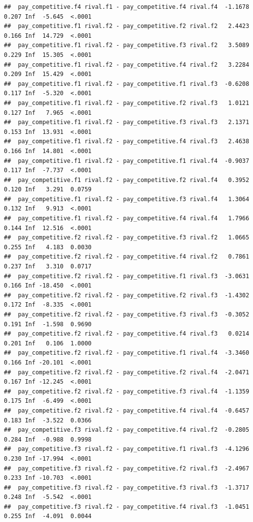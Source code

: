 \documentclass[
]{article}
\begin{document}
\begin{verbatim}
##  pay_competitive.f4 rival.f1 - pay_competitive.f4 rival.f4  -1.1678 0.207 Inf  -5.645  <.0001
##  pay_competitive.f1 rival.f2 - pay_competitive.f2 rival.f2   2.4423 0.166 Inf  14.729  <.0001
##  pay_competitive.f1 rival.f2 - pay_competitive.f3 rival.f2   3.5089 0.229 Inf  15.305  <.0001
##  pay_competitive.f1 rival.f2 - pay_competitive.f4 rival.f2   3.2284 0.209 Inf  15.429  <.0001
##  pay_competitive.f1 rival.f2 - pay_competitive.f1 rival.f3  -0.6208 0.117 Inf  -5.320  <.0001
##  pay_competitive.f1 rival.f2 - pay_competitive.f2 rival.f3   1.0121 0.127 Inf   7.965  <.0001
##  pay_competitive.f1 rival.f2 - pay_competitive.f3 rival.f3   2.1371 0.153 Inf  13.931  <.0001
##  pay_competitive.f1 rival.f2 - pay_competitive.f4 rival.f3   2.4638 0.166 Inf  14.801  <.0001
##  pay_competitive.f1 rival.f2 - pay_competitive.f1 rival.f4  -0.9037 0.117 Inf  -7.737  <.0001
##  pay_competitive.f1 rival.f2 - pay_competitive.f2 rival.f4   0.3952 0.120 Inf   3.291  0.0759
##  pay_competitive.f1 rival.f2 - pay_competitive.f3 rival.f4   1.3064 0.132 Inf   9.913  <.0001
##  pay_competitive.f1 rival.f2 - pay_competitive.f4 rival.f4   1.7966 0.144 Inf  12.516  <.0001
##  pay_competitive.f2 rival.f2 - pay_competitive.f3 rival.f2   1.0665 0.255 Inf   4.183  0.0030
##  pay_competitive.f2 rival.f2 - pay_competitive.f4 rival.f2   0.7861 0.237 Inf   3.310  0.0717
##  pay_competitive.f2 rival.f2 - pay_competitive.f1 rival.f3  -3.0631 0.166 Inf -18.450  <.0001
##  pay_competitive.f2 rival.f2 - pay_competitive.f2 rival.f3  -1.4302 0.172 Inf  -8.335  <.0001
##  pay_competitive.f2 rival.f2 - pay_competitive.f3 rival.f3  -0.3052 0.191 Inf  -1.598  0.9690
##  pay_competitive.f2 rival.f2 - pay_competitive.f4 rival.f3   0.0214 0.201 Inf   0.106  1.0000
##  pay_competitive.f2 rival.f2 - pay_competitive.f1 rival.f4  -3.3460 0.166 Inf -20.101  <.0001
##  pay_competitive.f2 rival.f2 - pay_competitive.f2 rival.f4  -2.0471 0.167 Inf -12.245  <.0001
##  pay_competitive.f2 rival.f2 - pay_competitive.f3 rival.f4  -1.1359 0.175 Inf  -6.499  <.0001
##  pay_competitive.f2 rival.f2 - pay_competitive.f4 rival.f4  -0.6457 0.183 Inf  -3.522  0.0366
##  pay_competitive.f3 rival.f2 - pay_competitive.f4 rival.f2  -0.2805 0.284 Inf  -0.988  0.9998
##  pay_competitive.f3 rival.f2 - pay_competitive.f1 rival.f3  -4.1296 0.230 Inf -17.994  <.0001
##  pay_competitive.f3 rival.f2 - pay_competitive.f2 rival.f3  -2.4967 0.233 Inf -10.703  <.0001
##  pay_competitive.f3 rival.f2 - pay_competitive.f3 rival.f3  -1.3717 0.248 Inf  -5.542  <.0001
##  pay_competitive.f3 rival.f2 - pay_competitive.f4 rival.f3  -1.0451 0.255 Inf  -4.091  0.0044

\end{verbatim}
\end{document}
